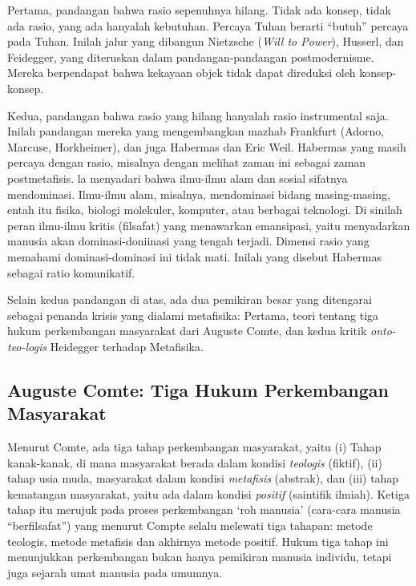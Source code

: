\documentclass[11pt,twoside,a5paper,openany]{memoir}
\begin{document}
Pertama, pandangan bahwa rasio sepenuhnya hilang. Tidak ada konsep,
tidak ada rasio, yang ada hanyalah kebutuhan. Percaya Tuhan berarti
``butuh'' percaya pada Tuhan. Inilah jalur yang dibangun Nietzsche
(\emph{Will to Power}), Husserl, dan Feidegger, yang diteruskan dalam
pandangan-pandangan postmodernisme. Mereka berpendapat bahwa kekayaan
objek tidak dapat direduksi oleh konsep-konsep.

Kedua, pandangan bahwa rasio yang hilang hanyalah rasio instrumental
saja. Inilah pandangan mereka yang mengembangkan mazhab Frankfurt
(Adorno, Marcuse, Horkheimer), dan juga Habermas dan Eric Weil. Habermas
yang masih percaya dengan rasio, misalnya dengan melihat zaman ini
sebagai zaman postmetafisis. la menyadari bahwa ilmu-ilmu alam dan
sosial sifatnya mendominasi. Ilmu-ilmu alam, misalnya, mendominasi
bidang masing-masing, entah itu fisika, biologi molekuler, komputer,
atau berbagai teknologi. Di sinilah peran ilmu-ilmu kritis (filsafat)
yang menawarkan emansipasi, yaitu menyadarkan manusia akan
dominasi-doniinasi yang tengah terjadi. Dimensi rasio yang memahami
dominasi-dominasi ini tidak mati. Inilah yang disebut Habermas sebagai
ratio komunikatif.

Selain kedua pandangan di atas, ada dua pemikiran besar yang ditengarai
sebagai penanda krisis yang dialami metafisika: Pertama, teori tentang
tiga hukum perkembangan masyarakat dari Auguste Comte, dan kedua kritik
\emph{onto-teo-logis} Heidegger terhadap Metafisika.

\hypertarget{auguste-comte-tiga-hukum-perkembangan-masyarakat}{%
\subsection{Auguste Comte: Tiga Hukum Perkembangan
Masyarakat}\label{auguste-comte-tiga-hukum-perkembangan-masyarakat}}

Menurut Comte, ada tiga tahap perkembangan masyarakat, yaitu (i) Tahap
kanak-kanak, di mana masyarakat berada dalam kondisi \emph{teologis}
(fiktif), (ii) tahap usia muda, masyarakat dalam kondisi
\emph{metafisis} (abstrak), dan (iii) tahap kematangan masyarakat, yaitu
ada dalam kondisi \emph{positif} (saintifik ilmiah). Ketiga tahap itu
merujuk pada proses perkembangan `roh manusia' (cara-cara manusia
``berfilsafat'') yang menurut Compte selalu melewati tiga tahapan:
metode teologis, metode metafisis dan akhirnya metode positif. Hukum
tiga tahap ini menunjukkan perkembangan bukan hanya pemikiran manusia
individu, tetapi juga sejarah umat manusia pada umumnya.
\end{document}
